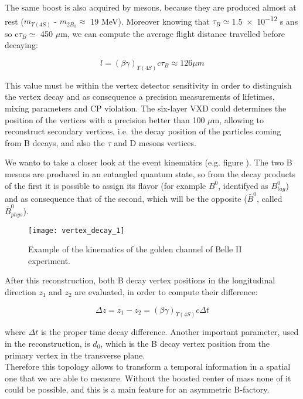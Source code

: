 The same boost is also acquired by mesons, because they are produced almost at rest ($m_{\Upsilon(4S)}$ - $m_{2B_{0}}\approx$ 19 MeV). Moreover knowing that $\tau_{B}\simeq $\num{1.5e-12} s ans so c$\tau_{B}\simeq$ 450 $\mu$m, we can compute the average flight distance travelled before decaying:

\begin{equation}
\textit{l} = (\beta\gamma)_{\Upsilon(4S)}c\tau_{B} \approx 126 \mu m  
\end{equation} 

This value must be within the vertex detector sensitivity in order to distinguish the vertex decay and as consequence a precision measurements of lifetimes, mixing parameters and CP violation. The six-layer VXD could determines the position of the vertices with a precision better than 100 $\mu$m, allowing to reconstruct secondary vertices, i.e. the decay position of the particles coming from B decays, and also the $\tau$ and D mesons vertices.

We wanto to take a closer look at the event kinematics (e.g. figure ). The two B mesons are produced in an entangled quantum state, so from the decay products of the first it is possible to assign its flavor (for example $B^{0}$, identifyed as $B_{tag}^{0}$) and as consequence that of the second, which will be the opposite ($\bar{B}^{0}$, called $\bar{B}_{phys}^{0}$).

\begin{figure}[h!]
\centering
\texttt{[image: vertex\_decay\_1]}
\caption{Example of the kinematics of the golden channel of Belle II experiment.}
\label{fig:decay_vertex}
\end{figure}

After this reconstruction, both B decay vertex positions in the longitudinal direction $\textit{z}_{1}$ and $\textit{z}_{2}$ are evaluated, in order to compute their difference:

\begin{equation}
\Delta \textit{z} = \textit{z}_{1} - \textit{z}_{2} = (\beta\gamma)_{\Upsilon(4S)}c\Delta t
\end{equation}

where $\Delta t$ is the proper time decay difference. 
Another important parameter, used in the reconstruction, is \textit{$d_{0}$}, which is the B decay vertex position from the primary vertex in the transverse plane.\\
Therefore this topology allows to transform a temporal information in a spatial one that we are able to measure. Without the boosted center of mass none of it could be possible, and this is a main feature for an asymmetric B-factory. 

